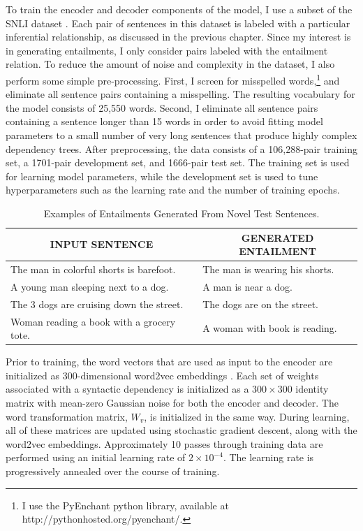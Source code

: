 To train the encoder and decoder components of the model, I use a subset of the SNLI dataset \citep{Bowman:2015}. Each pair of sentences in this dataset is labeled with a particular inferential relationship, as discussed in the previous chapter. Since my interest is in generating entailments, I only consider pairs labeled with the entailment relation. To reduce the amount of noise and complexity in the dataset, I also perform some simple pre-processing. First, I screen for misspelled words,\footnote{I use the PyEnchant python library, available at http://pythonhosted.org/pyenchant/.} and eliminate all sentence pairs containing a misspelling. The resulting vocabulary for the model consists of 25,550 words. Second, I eliminate all sentence pairs containing a sentence longer than 15 words in order to avoid fitting model parameters to a small number of very long sentences that produce highly complex dependency trees. After preprocessing, the data consists of a 106,288-pair training set, a 1701-pair development set, and 1666-pair test set. The training set is used for learning model parameters, while the development set is used to tune hyperparameters such as the learning rate and the number of training epochs.

\begin{table}[!t]
\begin{center} 

\caption{Examples of Entailments Generated From Novel Test Sentences.} 

\label{examples}
\vskip 0.06in
\setlength{\tabcolsep}{12pt}
\begin{tabular}{ll} 
\hline

\multicolumn{1}{c}{\rule{0pt}{3ex} INPUT SENTENCE} & 
\multicolumn{1}{c}{GENERATED ENTAILMENT} \\

\hline
\rule{0pt}{3ex}The man in colorful shorts is barefoot. & The man is wearing his shorts. \\
A young man sleeping next to a dog. & A man is near a dog. \\
The 3 dogs are cruising down the street. & The dogs are on the street. \\
Woman reading a book with a grocery tote. & A woman with book is reading. \\
\hline
\end{tabular}
\end{center} 
\end{table}

Prior to training, the word vectors that are used as input to the encoder are initialized as 300-dimensional word2vec embeddings \citep{Mikolov:2013}. Each set of weights associated with a syntactic dependency is initialized as a $300 \times 300$ identity matrix with mean-zero Gaussian noise for both the encoder and decoder. The word transformation matrix, $W_v$, is initialized in the same way. During learning, all of these matrices are updated using stochastic gradient descent, along with the word2vec embeddings. Approximately 10 passes through training data are performed using an initial learning rate of $2 \times 10^{-4}$. The learning rate is progressively annealed over the course of training.

